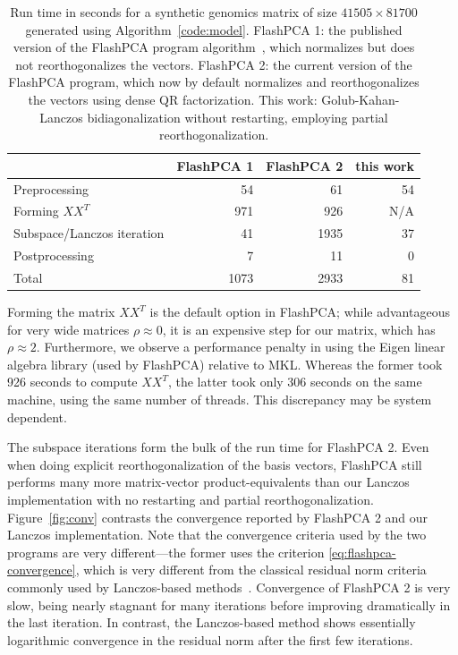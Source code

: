 \documentclass[review]{siamart0516}
\begin{document}
\begin{table}
    \caption{Run time in seconds for a synthetic genomics matrix of
    size $41505\times81700$ generated using Algorithm~\ref{code:model}.
    FlashPCA 1: the published version of the FlashPCA program
    algorithm~\cite{abraham2014fast}, which normalizes but does not reorthogonalizes
    the vectors. FlashPCA 2: the current version of the FlashPCA program,
    which now by default normalizes and reorthogonalizes the vectors using dense
    QR factorization. This work: Golub-Kahan-Lanczos bidiagonalization without
    restarting, employing partial reorthogonalization.
    \label{tab:runtime}
    }
    \centering
    \begin{tabular}{lrrr}
                                   & FlashPCA 1 & FlashPCA 2   & this work     \\ \hline
        Preprocessing              &   54        &   61        & 54            \\
        Forming $XX^T$             &  971        &  926        & N/A           \\
        Subspace/Lanczos iteration &   41        & 1935        & 37            \\
        Postprocessing             &    7        &   11        & 0             \\ \hline
        Total                      & 1073        & 2933        & 81  \\ \hline
    \end{tabular}
\end{table}


Forming the matrix $XX^T$ is the default option in FlashPCA; while advantageous
for very wide matrices $\rho \approx 0$, it is an expensive step for our matrix,
which has $\rho \approx 2$.
Furthermore, we observe a performance penalty in using the Eigen linear algebra
library (used by FlashPCA) relative to MKL.
Whereas the former took 926 seconds to compute $XX^T$, the latter took only
306 seconds on the same machine, using the same number of threads.
This discrepancy may be system dependent.

The subspace iterations form the bulk of the run time for FlashPCA 2. Even when
doing explicit reorthogonalization of the basis vectors, FlashPCA still performs
many more matrix-vector product-equivalents than our Lanczos implementation with
no restarting and partial reorthogonalization. Figure~\ref{fig:conv} contrasts
the convergence reported by FlashPCA 2 and our Lanczos implementation. Note that
the convergence criteria used by the two programs are very different---the former
uses the criterion \eqref{eq:flashpca-convergence}, which is very different from
the classical residual norm criteria commonly used by Lanczos-based
methods~\cite{Parlett1998}. Convergence of FlashPCA 2 is very slow,
being nearly stagnant for many iterations before improving dramatically
in the last iteration. In contrast, the Lanczos-based method shows essentially
logarithmic convergence in the residual norm after the first few iterations.
\end{document}
